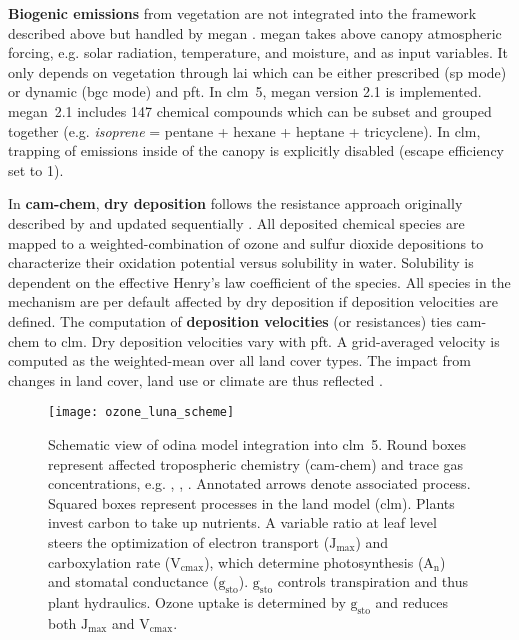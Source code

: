 \textbf{Biogenic emissions} from vegetation are not integrated into the framework described above but handled by \gls{megan} \parencite{ACP:Guenther2006}. \gls{megan} takes above canopy atmospheric forcing, e.g. solar radiation, temperature, and moisture, and \ch{[CO_2]} as input variables. It only depends on vegetation through \gls{lai} which can be either prescribed (\gls{sp} mode) or dynamic (\gls{bgc} mode) and \gls{pft}. In \gls{clm}~5, \gls{megan} version 2.1 \parencite{GMD:Guenther2012} is implemented. \gls{megan}~2.1 includes 147 chemical compounds which can be subset and grouped together (e.g. \emph{isoprene} = pentane + hexane + heptane + tricyclene). In \gls{clm}, trapping of emissions inside of the canopy is explicitly disabled (escape efficiency set to 1).

In \textbf{\gls{cam}-chem}, \textbf{dry deposition} follows the resistance approach originally described by \textcites{AE:Wesely1989}{AE:Walcek1986} and updated sequentially \parencites{AE:Walmsley1996}{AE:Wesely2000}. All deposited chemical species are mapped to a weighted-combination of ozone and sulfur dioxide depositions to characterize their oxidation potential versus solubility in water. Solubility is dependent on the effective Henry’s law coefficient of the species. All species in the mechanism are per default affected by dry deposition if deposition velocities are defined. 
The computation of \textbf{deposition velocities} (or resistances) ties \gls{cam}-chem to \gls{clm}. Dry deposition velocities vary with \gls{pft}. A grid-averaged velocity is computed as the weighted-mean over all land cover types. The impact from changes in land cover, land use or climate are thus reflected \parencite{GMD:Lamarque2012}. 

\begin{wrapfigure}[]{L}[0pt]{0.5\textwidth}
  \centering
  \texttt{[image: ozone\_luna\_scheme]}
  \caption{Schematic view of \gls{odina} model integration into \gls{clm}~5. Round boxes represent affected tropospheric chemistry (\gls{cam}-chem) and trace gas concentrations, e.g. \ch{[CO_2]}, \ch{[O_3]}, \ch{[H_2O]}. Annotated arrows denote associated process. Squared boxes represent processes in the land model (\gls{clm}). Plants {\color{darkgray}invest carbon} to {\color{darkgray}take up nutrients}. A variable  ratio at leaf level steers the optimization of electron transport ($\mathrm{J_{max}}$) and carboxylation rate ($\mathrm{V_{cmax}}$), which determine photosynthesis ($\mathrm{A_n}$) and stomatal conductance ($\mathrm{g_{sto}}$). $\mathrm{g_{sto}}$ controls transpiration and thus {\color{blue}plant hydraulics}. {\color{red}Ozone uptake} is determined by $\mathrm{g_{sto}}$ and reduces both $\mathrm{J_{max}}$ and $\mathrm{V_{cmax}}$.
}
  \label{fig:ozone_odina}
\end{wrapfigure}

